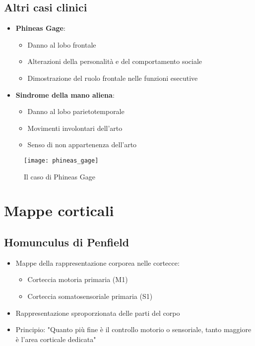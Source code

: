 \documentclass[11pt]{article}
\begin{document}
\subsection*{Altri casi clinici}
\begin{itemize}
    \item \textbf{Phineas Gage}:
    \begin{itemize}
        \item Danno al lobo frontale
        \item Alterazioni della personalità e del comportamento sociale
        \item Dimostrazione del ruolo frontale nelle funzioni esecutive
    \end{itemize}
    
    \item \textbf{Sindrome della mano aliena}:
    \begin{itemize}
        \item Danno al lobo parietotemporale
        \item Movimenti involontari dell'arto
        \item Senso di non appartenenza dell'arto
    \end{itemize}
\end{itemize}

\begin{figure}[h]
    \centering
    \texttt{[image: phineas\_gage]} %
    \caption{Il caso di Phineas Gage}
    \label{fig:gage}
\end{figure}

\section*{Mappe corticali}

\subsection*{Homunculus di Penfield}
\begin{itemize}
    \item Mappe della rappresentazione corporea nelle cortecce:
    \begin{itemize}
        \item Corteccia motoria primaria (M1)
        \item Corteccia somatosensoriale primaria (S1)
    \end{itemize}
    \item Rappresentazione sproporzionata delle parti del corpo
    \item Principio: "Quanto più fine è il controllo motorio o sensoriale, tanto maggiore è l'area corticale dedicata"
\end{itemize}
\end{document}
